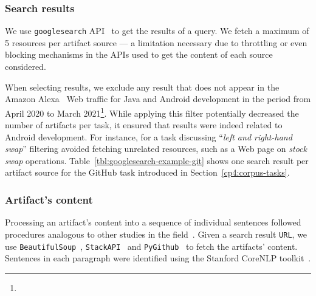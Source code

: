 \subsubsection{Search results}


We use \texttt{googlesearch} API~\cite{googlesearch} to get the results of a query. 
We fetch a maximum of 5 resources per artifact source --- a limitation necessary due to throttling or even blocking mechanisms in the APIs used to get the content of each source considered.


When selecting results, we exclude any result that does not appear in the Amazon Alexa~\cite{alexa} Web traffic for Java and Android development in the period from April 2020 to March 2021\footnote{}. 
While applying this filter potentially decreased the number of artifacts per task, it ensured that results were indeed related to Android development. 
For instance, for a task discussing ``\textit{left and right-hand swap}'' 
filtering avoided fetching unrelated resources, such as a Web page on  \textit{stock swap} operations.
Table~\ref{tbl:googlesearch-example-git} shows one search result per artifact source for the GitHub task introduced in Section~\ref{cp4:corpus-tasks}.




\subsubsection{Artifact's content}


Processing an artifact's content into a sequence of individual sentences 
followed procedures analogous to other studies in the field~\cite{Arya2019, nadi2020}.
Given a search result \texttt{URL}, we use \texttt{BeautifulSoup}~\cite{beautifulsoup4},
\texttt{StackAPI}~\cite{StackAPI} and \texttt{PyGithub}~\cite{PyGithub}
to fetch the artifacts' content. Sentences in each paragraph
were identified using the Stanford CoreNLP toolkit~\cite{CoreNLP}.








